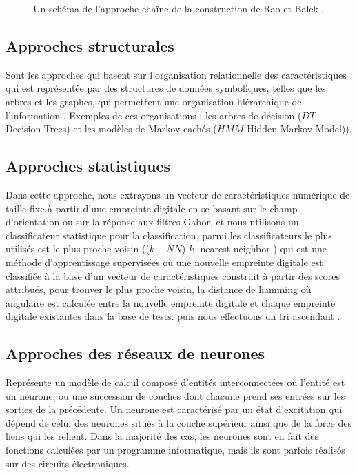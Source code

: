 \begin{center}
	\begin{figure}[H]
		\centering
		\caption{Un schéma de l'approche chaîne de la construction de Rao et Balck  \citep{karu1996fingerprint}.}
		\label{fig:chapitre2classificationsyntax}
	\end{figure}
\end{center}
\subsection{Approches structurales}
Sont les approches qui basent sur l'organisation relationnelle des caractéristiques qui est représentée par des structures de données symboliques, telles que les arbres et les graphes, qui permettent une organisation hiérarchique de l'information \citep{maio1996structural}. Exemples de ces organisations : les arbres de décision ($ DT $ Decision Trees) et les modèles de Markov cachés ($ HMM $ Hidden Markov Model)).
\subsection{Approches statistiques}
\label{KNN}
Dans cette approche, nous extrayons un vecteur de caractéristiques numérique de taille fixe à partir d'une empreinte digitale en se basant sur le champ d'orientation ou sur la réponse aux filtres Gabor, et nous utilisons un classificateur statistique pour la classification, parmi les classificateurs le plus utilisés est le plus proche voisin (($ k-NN $) $ k $- nearest neighbor ) qui est une méthode d'apprentissage supervisées où une nouvelle empreinte digitale est classifiée à la base d'un vecteur de caractéristiques construit à partir des scores attribués, pour trouver le plus proche voisin, la distance de hamming où angulaire est calculée entre la nouvelle empreinte digitale et chaque empreinte digitale existantes dans la base de tests. puis nous effectuons un tri ascendant \citep{kong2009survey}.
\subsection{Approches des réseaux de neurones }
\label{NN}
Représente un modèle de calcul composé d'entités interconnectées où l'entité est un neurone, ou une succession de couches dont chacune prend ses entrées sur les sorties de la précédente. Un neurone est caractérisé par un état d'excitation qui dépend de celui des neurones situés à la couche supérieur ainsi que de la force des liens qui les relient. Dans la majorité des cas, les neurones sont en fait des fonctions calculées par un programme informatique, mais ils sont parfois réalisés sur des circuits électroniques.
